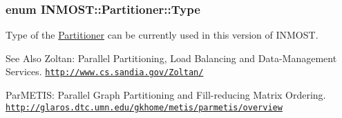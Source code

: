 \hypertarget{classINMOST_1_1Partitioner_a0699b96f7945e283398750d585eca311}{
\subsubsection[{Type}]{\setlength{\rightskip}{0pt plus 5cm}enum {\bf I\-N\-M\-O\-S\-T\-::\-Partitioner\-::\-Type}}}\label{classINMOST_1_1Partitioner_a0699b96f7945e283398750d585eca311}


Type of the \hyperlink{classINMOST_1_1Partitioner}{Partitioner} can be currently used in this version of I\-N\-M\-O\-S\-T. 

\begin{DoxySeeAlso}{See Also}
Zoltan\-: Parallel Partitioning, Load Balancing and Data-\/\-Management Services. \href{http://www.cs.sandia.gov/Zoltan/}{\tt http\-://www.\-cs.\-sandia.\-gov/\-Zoltan/} 

Par\-M\-E\-T\-I\-S\-: Parallel Graph Partitioning and Fill-\/reducing Matrix Ordering. \href{http://glaros.dtc.umn.edu/gkhome/metis/parmetis/overview}{\tt http\-://glaros.\-dtc.\-umn.\-edu/gkhome/metis/parmetis/overview} 
\end{DoxySeeAlso}
